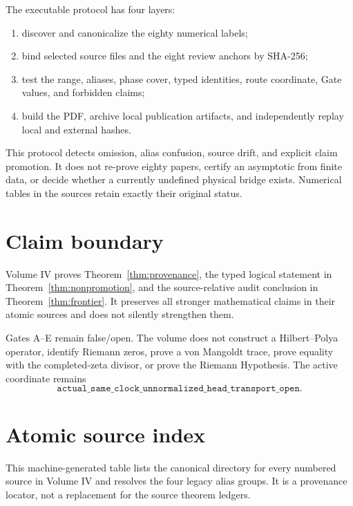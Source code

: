 \documentclass[11pt]{article}
\theoremstyle{definition}
\theoremstyle{remark}
\begin{document}
The executable protocol has four layers:
\begin{enumerate}[leftmargin=2.2em]
\item discover and canonicalize the eighty numerical labels;
\item bind selected source files and the eight review anchors by SHA-256;
\item test the range, aliases, phase cover, typed identities, route coordinate,
Gate values, and forbidden claims;
\item build the PDF, archive local publication artifacts, and independently
replay local and external hashes.
\end{enumerate}

This protocol detects omission, alias confusion, source drift, and explicit
claim promotion.  It does not re-prove eighty papers, certify an asymptotic
from finite data, or decide whether a currently undefined physical bridge
exists.  Numerical tables in the sources retain exactly their original
status.

\section{Claim boundary}

Volume IV proves Theorem~\ref{thm:provenance}, the typed logical statement in
Theorem~\ref{thm:nonpromotion}, and the source-relative audit conclusion in
Theorem~\ref{thm:frontier}.  It preserves all stronger mathematical claims in
their atomic sources and does not silently strengthen them.

Gates A--E remain false/open.  The volume does not construct a Hilbert--Polya
operator, identify Riemann zeros, prove a von Mangoldt trace, prove equality
with the completed-zeta divisor, or prove the Riemann Hypothesis.  The active
coordinate remains
\[
\boxed{\texttt{actual\_same\_clock\_unnormalized\_head\_transport\_open}}.
\]

\appendix
\section{Atomic source index}

This machine-generated table lists the canonical directory for every numbered
source in Volume IV and resolves the four legacy alias groups.  It is a
provenance locator, not a replacement for the source theorem ledgers.


\end{document}
